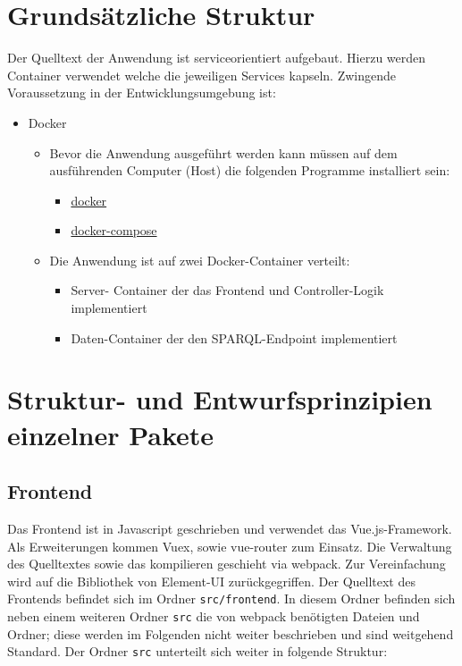 \documentclass[a4paper,11pt,oneside, titlepage]{article}
\begin{document}
\section{Grundsätzliche Struktur}
Der Quelltext der Anwendung ist serviceorientiert aufgebaut. Hierzu werden Container verwendet welche die jeweiligen Services kapseln. Zwingende Voraussetzung in der Entwicklungsumgebung ist: 
\begin{itemize}
	\item Docker
	\begin{itemize}
		\item Bevor die Anwendung ausgeführt werden kann müssen auf dem ausführenden Computer (Host) die folgenden Programme installiert sein:
		\begin{itemize}
			\item \href{https://www.docker.com/get-docker}{docker}
			\item \href{https://docs.docker.com/compose/}{docker-compose} 
		\end{itemize}
		\item Die Anwendung ist auf zwei Docker-Container verteilt:
		\begin{itemize}
			\item Server-
			Container der das Frontend und Controller-Logik implementiert
			\item Daten-Container der den SPARQL-Endpoint implementiert
		\end{itemize}
		
	\end{itemize}	
\end{itemize}
\section{Struktur- und Entwurfsprinzipien einzelner Pakete}

  \subsection*{Frontend}
Das Frontend ist in Javascript geschrieben und verwendet das Vue.js-Framework. Als Erweiterungen kommen Vuex, sowie vue-router zum Einsatz. Die Verwaltung des Quelltextes sowie das kompilieren geschieht via webpack. Zur Vereinfachung wird auf die Bibliothek von Element-UI zurückgegriffen. Der Quelltext des Frontends befindet sich im Ordner \verb+src/frontend+. In diesem Ordner befinden sich neben einem weiteren Ordner \verb+src+ die von webpack benötigten Dateien und Ordner; diese werden im Folgenden nicht weiter beschrieben und sind weitgehend Standard. Der Ordner \verb+src+ unterteilt sich weiter in folgende Struktur:
\end{document}

